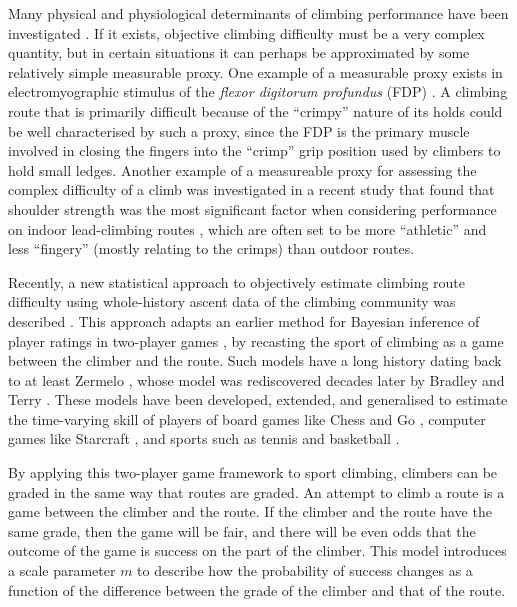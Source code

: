 \documentclass{article}
\begin{document}
Many physical and physiological determinants of climbing performance have been investigated \cite{balavs2012hand, balavs2014relationship, mackenzie2020physical}. If it exists, objective climbing difficulty must be a very complex quantity, but in certain situations it can perhaps be approximated by some relatively simple measurable proxy.  One example of a measurable proxy exists in electromyographic stimulus of the {\it flexor digitorum profundus} (FDP) \cite{delignieres1993psychophysical}.  A climbing route that is primarily difficult because of the ``crimpy'' nature of its holds could be well characterised by such a proxy, since the FDP is the primary muscle involved in closing the fingers into the ``crimp'' grip position used by climbers to hold small ledges.  Another example of a measureable proxy for assessing the complex difficulty of a climb was investigated in a recent study that found that shoulder strength was the most significant factor when considering performance on indoor lead-climbing routes \cite{mackenzie2020physical}, which are often set to be more ``athletic'' and less ``fingery'' (mostly relating to the crimps) than outdoor routes.

Recently, a new statistical approach to objectively estimate climbing route difficulty using whole-history ascent data of the climbing community was described \cite{scarff2020estimation}. This approach adapts an earlier method for Bayesian inference of player ratings in two-player games \cite{coulom2008whole}, by recasting the sport of climbing as a game between the climber and the route. Such models have a long history dating back to at least Zermelo \cite{zermelo1929berechnung}, whose model was rediscovered decades later by Bradley and Terry \cite{bradley1952rank}. These models have been developed, extended, and generalised to estimate the time-varying skill of players of board games like Chess \cite{Elo1978, glickman1999rating} and Go \cite{coulom2008whole}, computer games like Starcraft \cite{maystre2019pairwise}, and sports such as tennis \cite{maystre2019pairwise} and basketball \cite{maystre2019pairwise}.

By applying this two-player game framework to sport climbing, climbers can be graded in the same way that routes are graded. An attempt to climb a route is a game between the climber and the route. If the climber and the route have the same grade, then the game will be fair, and there will be even odds that the outcome of the game is success on the part of the climber. This model introduces a scale parameter $m$ to describe how the probability of success changes as a function of the difference between the grade of the climber and that of the route.
\end{document}

